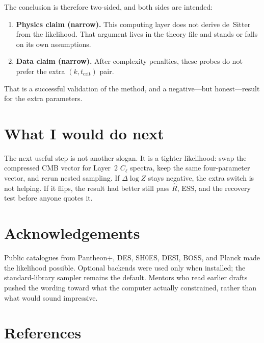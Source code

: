 \documentclass[12pt,letterpaper]{article}
\newcommand{\tcrit}{t_{\mathrm{crit}}}
\begin{document}
The conclusion is therefore two-sided, and both sides are intended:

\begin{enumerate}[leftmargin=1.6em]
  \item \textbf{Physics claim (narrow).} This computing layer does not
        derive de~Sitter from the likelihood. That argument lives in
        the theory file and stands or falls on its own assumptions.
  \item \textbf{Data claim (narrow).} After complexity penalties, these
        probes do not prefer the extra $(k,\tcrit)$ pair.
\end{enumerate}

That is a successful validation of the method, and a negative---but
honest---result for the extra parameters.

\section{What I would do next}

The next useful step is not another slogan. It is a tighter likelihood:
swap the compressed CMB vector for Layer~2 $C_\ell$ spectra, keep the
same four-parameter vector, and rerun nested sampling. If $\Delta\log Z$
stays negative, the extra switch is not helping. If it flips, the
result had better still pass $\widehat R$, ESS, and the recovery test
before anyone quotes it.

\section{Acknowledgements}

Public catalogues from Pantheon+, DES, SH0ES, DESI, BOSS, and Planck
made the likelihood possible. Optional backends were used only when
installed; the standard-library sampler remains the default. Mentors
who read earlier drafts pushed the wording toward what the computer
actually constrained, rather than what would sound impressive.

\section{References}
\end{document}
